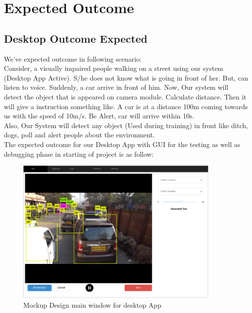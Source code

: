         \chapter{Expected Outcome}
        \section{Desktop Outcome Expected}
        We've expected outcome in following scenario:\\
        Consider, a visually impaired people walking on a street using our system (Desktop App Active). S/he does not know what is going in front of her. But, can listen to voice. Suddenly, a car arrive in front of him. Now, Our system will detect the object that is appeared on camera module. Calculate distance. Then it will give a instruction something like. A car is at a distance 100m coming towards us with the speed of 10m/s. Be Alert, car will arrive within 10s.\\
        Also, Our System will detect any object (Used during training) in front like ditch, dogs, poll and alert people about the environment.\\
        The expected outcome for our Desktop App with GUI for the testing as well as debugging phase in starting of project is as follow:
        \begin{figure}[ht]
                \centering
                        \includegraphics[width=0.9\textwidth]{img/VV1.png}
                        \caption{Mockup Design main window for desktop App}    
        \end{figure}

